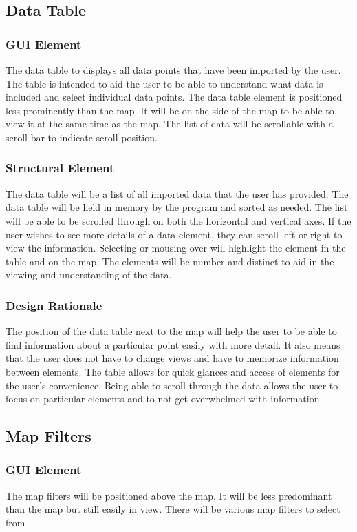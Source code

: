 \documentclass[onecolumn, draftclsnofoot,10pt, compsoc]{IEEEtran}
\begin{document}
\begin{singlespace}
    \subsection{Data Table}
        \subsubsection{GUI Element}
        The data table to displays all data points that have been imported by the user.  The table is intended to aid the user to be able to understand what data is included and select individual data points.  The data table element is positioned less prominently than the map.  It will be on the side of the map to be able to view it at the same time as the map.  The list of data will be scrollable with a scroll bar to indicate scroll position.
        \subsubsection{Structural Element}
        The data table will be a list of all imported data that the user has provided.  The data table will be held in memory by the program and sorted as needed.  The list will be able to be scrolled through on both the horizontal and vertical axes.  If the user wishes to see more details of a data element, they can scroll left or right to view the information.  Selecting or mousing over will highlight the element in the table and on the map.  The elements will be number and distinct to aid in the viewing and understanding of the data.
        \subsubsection{Design Rationale}%
        The position of the data table next to the map will help the user to be able to find information about a particular point easily with more detail.  It also means that the user does not have to change views and have to memorize information between elements.  The table allows for quick glances and access of elements for the user's convenience.  Being able to scroll through the data allows the user to focus on particular elements and to not get overwhelmed with information.
    \subsection{Map Filters}
        \subsubsection{GUI Element}
        The map filters will be positioned above the map. It will be less predominant than the map but still easily in view. There will be various map filters to select from

\end{singlespace}
\end{document}
